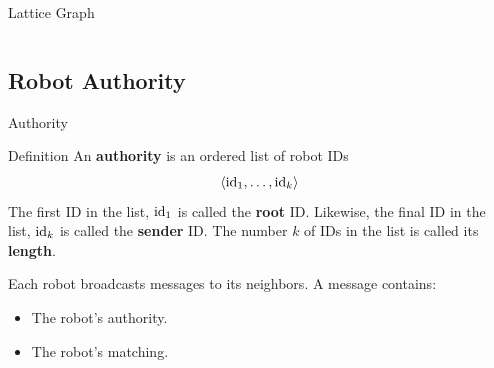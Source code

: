 \documentclass[10pt]{beamer}
\newcommand{\id}{{\rm id}}
\begin{document}
\begin{frame}{Lattice Graph}
\begin{columns}[T]
\begin{column}{.5\textwidth}
      \end{column}%
    \end{columns}
\end{frame}

\subsection{Robot Authority}
\begin{frame}{Authority}
  \begin{block}{}
    \begin{bclogo}[couleur=orange!10, arrondi=0.2, ombre=true]{Definition} 
      An \textbf{authority} is an ordered list of robot IDs
      $$ \langle \id_1, \ldots, \id_k \rangle $$
      The first ID in the list, $\id_1$ is called the \textbf{root} ID.
      Likewise, the final ID in the list, $\id_k$ is called the
      \textbf{sender} ID.  The number $k$ of IDs in the list is called
      its \textbf{length}.
    \end{bclogo}
  \end{block}
  \begin{block}{Each robot broadcasts messages to its neighbors.}
    A message contains:\\
  \begin{itemize}
    \item The robot's authority.
    \item The robot's matching.
  \end{itemize}
  \end{block}
\end{frame}
\end{document}
